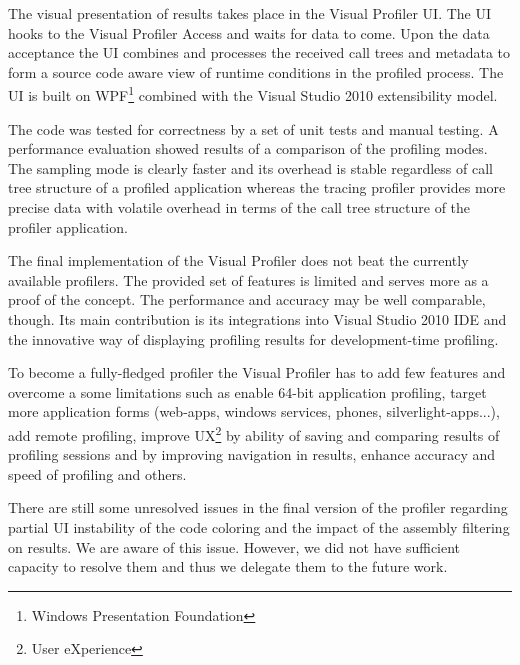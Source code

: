 The visual presentation of results takes place in the Visual Profiler UI. The UI hooks to the Visual Profiler Access and waits for data to come. Upon the data acceptance the UI combines and processes the received call trees and metadata to form a source code aware view of runtime conditions in the profiled process. The UI is built on WPF\footnote{Windows Presentation Foundation} combined with the Visual Studio 2010 extensibility model. 

The code was tested for correctness by a set of unit tests and manual testing. A performance evaluation showed results of a comparison of the profiling
modes. The sampling mode is clearly faster and its overhead is stable regardless of call tree structure of a profiled application whereas the tracing profiler provides more precise data with volatile overhead in terms of the call tree structure of the profiler application.

The final implementation of the Visual Profiler does not beat the currently available profilers. The provided set of features is limited and serves more as a proof of the concept. The performance and accuracy may be well comparable, though. Its main contribution is its integrations into Visual Studio 2010 IDE and the innovative way of displaying profiling results for development-time profiling.

To become a fully-fledged profiler the Visual Profiler has to add few features and overcome a some limitations such as 
enable 64-bit application profiling,
target more application forms  (web-apps, windows services, phones, silverlight-apps...),
add remote profiling,
improve UX\footnote{User eXperience} by ability of saving and comparing results of profiling sessions and by improving navigation in results,
enhance accuracy and speed of profiling and others.

There are still some unresolved issues in the final version of the profiler regarding partial UI instability of the code coloring and the impact of the assembly filtering on results. We are aware of this issue. However, we did not have sufficient capacity to resolve them and thus we delegate them to the future work.






































